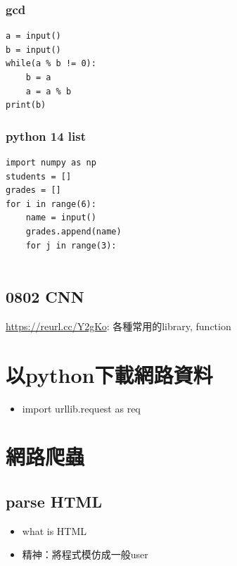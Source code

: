 \documentclass[a4paper,12pt]{article}
\begin{document}
\subsubsection{gcd}
\label{sec:org3ba7df7}
\lstset{breaklines=true,language=Python,label= ,caption= ,captionpos=b,firstnumber=1,numbers=left}
\begin{lstlisting}
a = input()
b = input()
while(a % b != 0):
    b = a
    a = a % b
print(b)
\end{lstlisting}

\subsubsection{python 14 list}
\label{sec:org5252041}
\lstset{breaklines=true,language=Python,label= ,caption= ,captionpos=b,firstnumber=1,numbers=left}
\begin{lstlisting}
import numpy as np
students = []
grades = []
for i in range(6):
    name = input()
    grades.append(name)
    for j in range(3):


\end{lstlisting}

\subsection{0802 CNN}
\label{sec:orge312555}
\url{https://reurl.cc/Y2gKo}: 各種常用的library, function\\

\section{以python下載網路資料}
\label{sec:org46394e1}
\begin{itemize}
\item import urllib.request as req\\
\end{itemize}

\section{網路爬蟲}
\label{sec:org32a7038}
\subsection{parse HTML}
\label{sec:org758b9b4}
\begin{itemize}
\item what is HTML\\
\item 精神：將程式模仿成一般user\\
\end{itemize}
\end{document}
